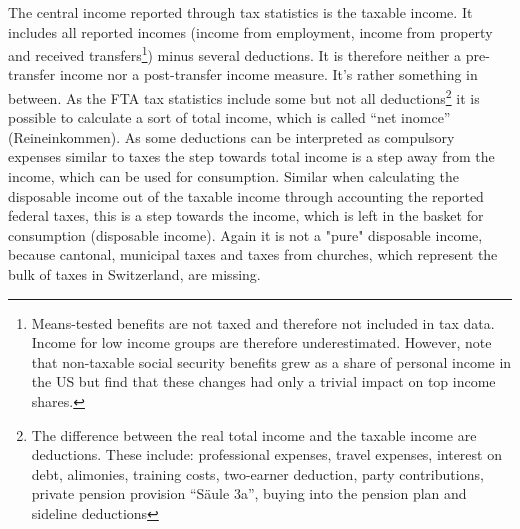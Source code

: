 \documentclass[twoside]{article}\usepackage[]{graphicx}\usepackage[]{color}
\begin{document}
\begin{multicols}{2}


The central income reported through tax statistics is the taxable income. It includes all reported incomes (income from employment, income from property and received transfers\footnote{Means-tested benefits are not taxed and therefore not included in tax data. Income for low income groups are therefore underestimated. However, \citep{piketty_income_2003} note that non-taxable social security benefits grew as a share of personal income in the US but find that these changes had only a trivial impact on top income shares.}) minus several deductions. It is therefore neither a pre-transfer income nor a post-transfer income measure. It's rather something in between. As the FTA tax statistics include some but not all deductions\footnote{The difference between the real total income and the taxable income are deductions. These include: professional expenses, travel expenses, interest on debt, alimonies, training costs, two-earner deduction, party contributions, private pension provision ``Säule 3a'', buying into the pension plan and sideline deductions} it is possible to calculate a sort of total income, which is called ``net inomce'' (Reineinkommen). As some deductions can be interpreted as compulsory expenses similar to taxes the step towards total income is a step away from the income, which can be used for consumption. Similar when calculating the disposable income out of the taxable income through accounting the reported federal taxes, this is a step towards the income, which is left in the basket for consumption (disposable income). Again it is not a "pure" disposable income, because cantonal, municipal taxes and taxes from churches, which represent the bulk of taxes in Switzerland, are missing.   \\   





\end{multicols}
\end{document}

